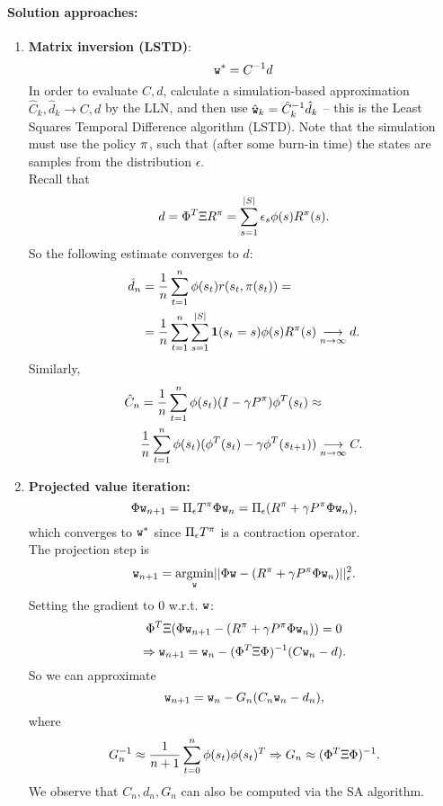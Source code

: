 \paragraph{Solution approaches:}
\begin{enumerate}
\item \textbf{Matrix inversion (LSTD)}: $$\texttt{w}^* = C^{-1}d$$
In order to evaluate $C,d$, calculate a simulation-based approximation $\hat{C}_k,\hat{d}_k \rightarrow C,d$ by the LLN, and then use $\hat{\texttt{w}}_k = \hat{C}_k^{-1} \hat{d}_k$ -- this is the Least Squares Temporal Difference algorithm (LSTD). Note that the simulation must use the policy $\pi$, such that (after some burn-in time) the states are samples from the distribution $\epsilon$.\\
Recall that
$$d = \Phi^T \Xi R^\pi = \sum_{s=1}^{|S|} \epsilon_s  {\phi}(s) R^\pi(s).$$
So the following estimate converges to $d$:
\begin{align*}
\hat{d}_n &= \frac{1}{n} \sum_{t=1}^n  {\phi}(s_t) r(s_t,\pi(s_t)) = \\
&= \frac{1}{n}\sum_{t=1}^n\sum_{s=1}^{|S|} {\bf1}(s_t=s) {\phi}(s) R^\pi(s) \underset{n\rightarrow \infty}{\longrightarrow} d .
\end{align*}
Similarly,
\begin{align*}
\hat{C}_n &= \frac{1}{n} \sum_{t=1}^n  {\phi}(s_t)(I-\gamma P^\pi) {\phi}^T(s_t) \approx \\
&\frac{1}{n} \sum_{t=1}^n {\phi}(s_t)( {\phi}^T(s_t)-\gamma {\phi}^T(s_{t+1}))  \underset{n\rightarrow \infty}{\longrightarrow} C .
\end{align*}

\item \textbf{Projected value iteration:}
$$\Phi \texttt{w}_{n+1} = \Pi_\epsilon T^\pi \Phi \texttt{w}_n = \Pi_\epsilon(R^\pi+\gamma P^\pi \Phi \texttt{w}_n),$$
which converges to $\texttt{w}^*$ since $\Pi_\epsilon T^\pi$ is a contraction operator.\\

The projection step is
$$ \texttt{w}_{n+1} = \underset{\texttt{w}}{\operatorname{argmin}}||\Phi \texttt{w} - (R^\pi+\gamma P^\pi \Phi \texttt{w}_n)||_\epsilon^2.$$
Setting the gradient to $0$ w.r.t. $\texttt{w}$:
$$\Phi^T \Xi(\Phi \texttt{w}_{n+1} - (R^\pi+\gamma P^\pi \Phi \texttt{w}_n)) = 0$$
$$\Rightarrow \texttt{w}_{n+1} = \texttt{w}_n - (\Phi^T\Xi\Phi)^{-1}(C \texttt{w}_n-d).$$
So we can approximate
$$\texttt{w}_{n+1} = \texttt{w}_n - G_n(C_n \texttt{w}_n -d_n),$$
where
$$G_n^{-1} \approx \frac{1}{n+1} \sum_{t=0}^n  {\phi}(s_t) {\phi}(s_t)^T \Rightarrow G_n \approx (\Phi^T \Xi \Phi)^{-1}.$$
We observe that $C_n,d_n,G_n$ can also be computed via the SA algorithm.


\end{enumerate}
